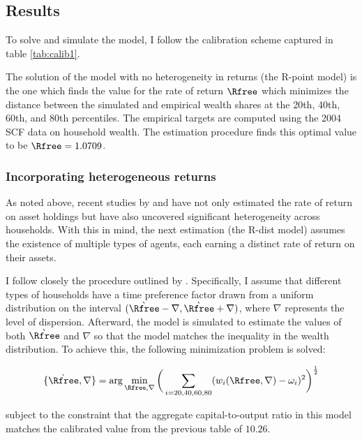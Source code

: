 \documentclass[\econtexRoot/Chp1proposal]{subfiles}
\begin{document}
\subsection{Results}
\par To solve and simulate the model, I follow the calibration scheme captured in table \ref{tab:calib1}.
\unskip

\par The solution of the model with no heterogeneity in returns (the R-point model) is the one which finds the value for the rate of return $\Rfree$ which minimizes the distance between the simulated and empirical wealth shares at the 20th, 40th, 60th, and 80th percentiles. The empirical targets are computed using the 2004 SCF data on household wealth. The estimation procedure finds this optimal value to be $\Rfree = 1.0709$.

\subsubsection{Incorporating heterogeneous returns}

\par As noted above, recent studies by \cite{aflgdmlp20} and \cite{lblcps18} have not only estimated the rate of return on asset holdings but have also uncovered significant heterogeneity across households. With this in mind, the next estimation (the R-dist model) assumes the existence of multiple types of agents, each earning a distinct rate of return on their assets.

\par I follow closely the procedure outlined by \cite{cstw2017}. Specifically, I assume that different types of households have a time preference factor drawn from a uniform distribution on the interval $(\grave{\Rfree} - \nabla, \grave{\Rfree} + \nabla)$, where $\nabla$ represents the level of dispersion. Afterward, the model is simulated to estimate the values of both $\grave{\Rfree}$ and $\nabla$ so that the model matches the inequality in the wealth distribution. To achieve this, the following minimization problem is solved:

$$ \{\grave{\Rfree}, \nabla\} = \text{arg}\min_{\Rfree, \nabla} \bigg( \sum_{i=20, 40, 60, 80} (w_{i}(\Rfree, \nabla)-\omega_i )^{2} \bigg)^{\frac{1}{2}} $$

\par subject to the constraint that the aggregate capital-to-output ratio in this model matches the calibrated value from the previous table of $10.26$.
\end{document}
